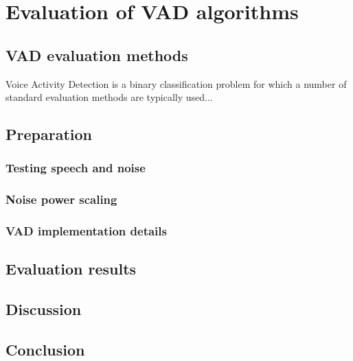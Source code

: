 
\chapter{Evaluation of VAD algorithms} %

\label{Chapter3} %



\section{VAD evaluation methods}

Voice Activity Detection is a binary classification problem for which a number of standard evaluation methods are typically used...

\section{Preparation}

\subsection{Testing speech and noise}

\subsection{Noise power scaling}

\subsection{VAD implementation details}

\section{Evaluation results}

\section{Discussion}

\section{Conclusion}